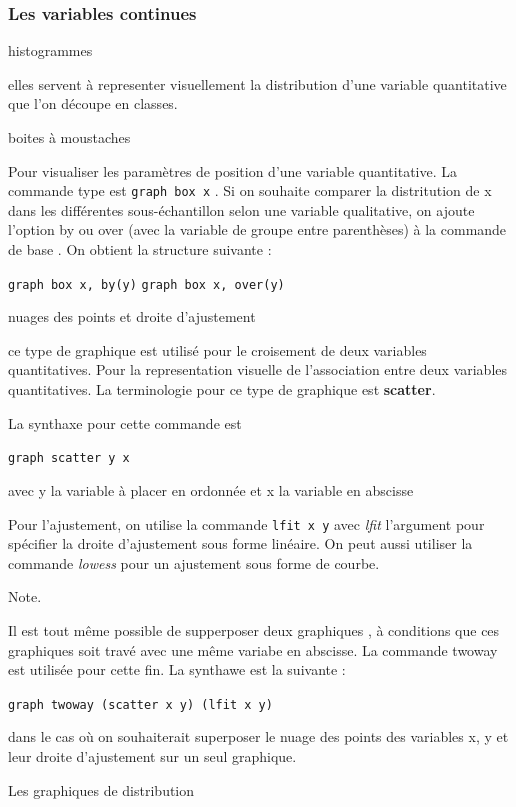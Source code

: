 \documentclass[
]{book}
\begin{document}
\hypertarget{les-variables-continues}{%
\subsubsection{Les variables continues}\label{les-variables-continues}}

histogrammes

elles servent à representer visuellement la distribution d'une variable quantitative que l'on découpe en classes.

boites à moustaches

Pour visualiser les paramètres de position d'une variable quantitative. La commande type est
\texttt{graph\ box\ x} . Si on souhaite comparer la distritution de x dans les différentes sous-échantillon selon une variable qualitative, on ajoute l'option by ou over (avec la variable de groupe entre parenthèses) à la commande de base . On obtient la structure suivante :

\texttt{graph\ box\ x,\ by(y)}
\texttt{graph\ box\ x,\ over(y)}

nuages des points et droite d'ajustement

ce type de graphique est utilisé pour le croisement de deux variables quantitatives. Pour la representation visuelle de l'association entre deux variables quantitatives.
La terminologie pour ce type de graphique est \textbf{scatter}.

La synthaxe pour cette commande est

\texttt{graph\ scatter\ y\ x}

avec y la variable à placer en ordonnée et x la variable en abscisse

Pour l'ajustement, on utilise la commande \texttt{lfit\ x\ y} avec \emph{lfit} l'argument pour spécifier la droite d'ajustement sous forme linéaire. On peut aussi utiliser la commande \emph{lowess} pour un ajustement sous forme de courbe.

Note.

Il est tout même possible de supperposer deux graphiques , à conditions que ces graphiques soit travé avec une même variabe en abscisse. La commande twoway est utilisée pour cette fin. La synthawe est la suivante :

\texttt{graph\ twoway\ (scatter\ x\ y)\ (lfit\ x\ y)}

dans le cas où on souhaiterait superposer le nuage des points des variables x, y et leur droite d'ajustement sur un seul graphique.

Les graphiques de distribution
\end{document}
